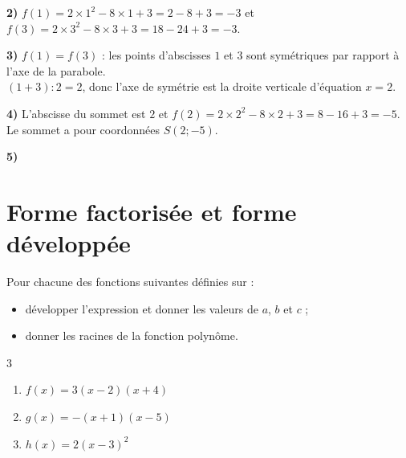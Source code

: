 \documentclass[11pt,a4paper]{book}
\begin{document}
\medskip
\begin{corrBox}
	\textbf{2)} $f(1)=2\times1^2-8\times1+3=2-8+3=-3$ \quad et \quad $f(3)=2\times3^2-8\times3+3=18-24+3=-3$.
\end{corrBox}

\medskip
\begin{corrBox}
	\textbf{3)} $f(1)=f(3)$ : les points d'abscisses $1$ et $3$ sont symétriques par rapport à l'axe de la parabole.\\
	$(1+3):2=2$, donc l'axe de symétrie est la droite verticale d'équation $x=2$.
\end{corrBox}

\medskip
\begin{corrBox}
	\textbf{4)} L'abscisse du sommet est $2$ et $f(2)=2\times2^2-8\times2+3=8-16+3=-5$.\\
	Le sommet a pour coordonnées $S(2 ; -5)$.
\end{corrBox}

\medskip
\begin{corrBox}
	\textbf{5)}
	\begin{center}
	\end{center}
\end{corrBox}

\section*{\color{green!55!black}Forme factorisée et forme développée}

\exerciceDS{}

Pour chacune des fonctions suivantes définies sur \R :
\begin{itemize}
	\item développer l'expression et donner les valeurs de $a$, $b$ et $c$ ;
	\item donner les racines de la fonction polynôme.
\end{itemize}

\begin{multicols}{3}
	\begin{enumerate}[label=\textbf{\alph*)}]
		\item $f(x)=3(x-2)(x+4)$
		\item $g(x)=-(x+1)(x-5)$
		\item $h(x)=2(x-3)^2$
	\end{enumerate}
\end{multicols}
\end{document}
